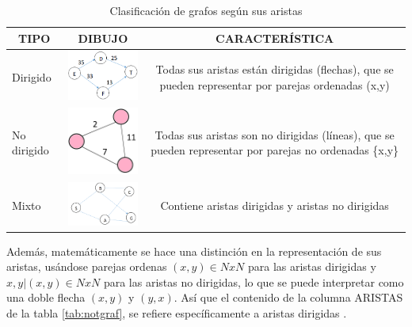 \begin{table}[H]
\caption{Clasificación de grafos según sus aristas}
\centering
\begin{tabular}[c]{lcc}
\multicolumn{1}{c}{\textbf{TIPO}} & \textbf{DIBUJO}                      & \textbf{CARACTERÍSTICA}  \\ \hline
\multicolumn{1}{|l|}{Dirigido}    & \multicolumn{1}{l|}{\includegraphics[align=t, width=36mm]{gafo dirigido.png} } &
\multicolumn{1}{p{6cm}|}{Todas sus aristas están dirigidas (flechas), que se pueden representar por parejas ordenadas (x,y)}     \\ \hline
\multicolumn{1}{|l|}{No dirigido} & \multicolumn{1}{l|}{\includegraphics[align=t,width=36mm]{gafo no dirigido.png}} & \multicolumn{1}{p{6cm}|}{Todas sus aristas son no dirigidas (líneas), que se pueden representar por parejas no ordenadas \{x,y\}} \\ \hline
\multicolumn{1}{|l|}{Mixto}       & \multicolumn{1}{l|}{\includegraphics[align=t,width=36mm]{elementos de un grafo.png}} & \multicolumn{1}{p{6cm}|}{Contiene aristas dirigidas y aristas no dirigidas} \\ \hline
\end{tabular}
\label{dirigido}
\end{table}

Además, matemáticamente se hace una distinción en la representación de sus aristas, usándose parejas ordenas $(x,y) \in NxN$ para las aristas dirigidas y ${x,y} | (x,y) \in NxN$ para las aristas no dirigidas, lo que se puede interpretar como una doble flecha $(x,y)$ y $(y,x)$. Así que el contenido de la columna ARISTAS de la tabla \ref{tab:notgraf}, se refiere específicamente a aristas dirigidas \citep{tremblay1996matematica}.

